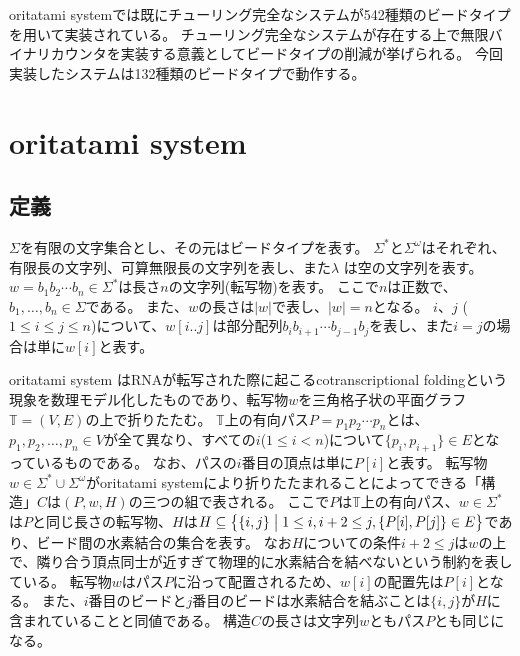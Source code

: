 \documentclass[a4,11pt]{article}
\begin{document}
oritatami systemでは既にチューリング完全なシステムが542種類のビードタイプを用いて実装されている\cite{GeMeScSe2018}。
チューリング完全なシステムが存在する上で無限バイナリカウンタを実装する意義としてビードタイプの削減が挙げられる。
今回実装したシステムは132種類のビードタイプで動作する。


\section{oritatami system}


\subsection{定義}
$\Sigma$を有限の文字集合とし、その元はビードタイプを表す。
$\Sigma^*$と$\Sigma^\omega$はそれぞれ、有限長の文字列、可算無限長の文字列を表し、また$\lambda$ は空の文字列を表す。
$w = b_1 b_2 \cdots b_n \in \Sigma^*$は長さ$n$の文字列(転写物)を表す。
ここで$n$は正数で、$b_1, \ldots, b_n \in \Sigma$である。
また、$w$の長さは$|w|$で表し、$|w| = n$となる。
$i$、$j$ ($1 \le i \le j \le n$)について、$w[i..j]$は部分配列$b_i b_{i+1} \cdots b_{j-1} b_j$を表し、また$i=j$の場合は単に$w[i]$と表す。

oritatami system はRNAが転写された際に起こるcotranscriptional foldingという現象を数理モデル化したものであり、転写物$w$を三角格子状の平面グラフ$\mathbb{T} = (V, E)$の上で折りたたむ。
$\mathbb{T}$上の有向パス$P = p_1 p_2 \cdots p_n$とは、$p_1, p_2, \ldots, p_n \in V$が全て異なり、すべての$i $($1 \le i < n$)について$\{p_i, p_{i+1}\} \in E$となっているものである。
なお、パスの$i$番目の頂点は単に$P[i]$と表す。
転写物$w \in \Sigma^* \cup \Sigma^\omega$がoritatami systemにより折りたたまれることによってできる「構造」$C$は$(P, w, H)$の三つの組で表される。
ここで$P$は$\mathbb{T}$上の有向パス、$w \in \Sigma^*$は$P$と同じ長さの転写物、$H$は$H \subseteq \bigl\{\{i, j\} \bigm| 1 \le i, i+2 \le j, \{P[i], P[j]\} \in E \bigr\}$であり、ビード間の水素結合の集合を表す。
なお$H$についての条件$i+2 \le j$は$w$の上で、隣り合う頂点同士が近すぎて物理的に水素結合を結べないという制約を表している。
転写物$w$はパス$P$に沿って配置されるため、$w[i]$の配置先は$P[i]$となる。
また、$i$番目のビードと$j$番目のビードは水素結合を結ぶことは$\{i, j\}$が$H$に含まれていることと同値である。
構造$C$の長さは文字列$w$ともパス$P$とも同じになる。
\end{document}
